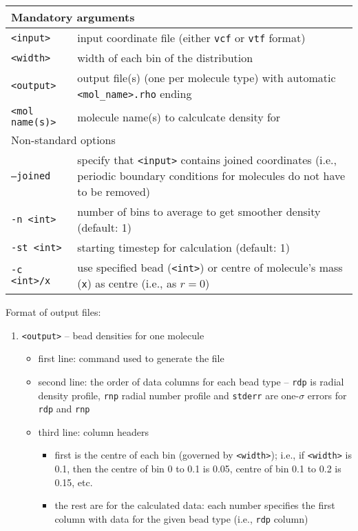 \noindent
\begin{longtable}{p{}p{}}
  \toprule
  \multicolumn{2}{l}{Mandatory arguments} \\
  \midrule
  \texttt{<input>} & input coordinate file (either \texttt{vcf} or
    \texttt{vtf} format) \\
  \texttt{<width>} & width of each bin of the distribution \\
  \texttt{<output>} & output file(s) (one per molecule type) with
    automatic \texttt{<mol\_name>.rho} ending \\
  \texttt{<mol name(s)>} & molecule name(s) to calculcate density for \\
  \toprule
  \multicolumn{2}{l}{Non-standard options} \\
  \midrule
  \texttt{--joined} & specify that \texttt{<input>} contains joined
    coordinates (i.e., periodic boundary conditions for molecules do not
    have to be removed) \\
  \texttt{-n <int>} & number of bins to average to get smoother density
    (default: 1) \\
  \texttt{-st <int>} & starting timestep for calculation (default: 1) \\
  \texttt{-c <int>/x} & use specified bead (\texttt{<int>}) or centre of
    molecule's mass (\texttt{x}) as centre (i.e., as $r=0$) \\
  \bottomrule
\end{longtable}

\noindent
Format of output files:
\begin{enumerate}[nosep,leftmargin=20pt]
  \item \texttt{<output>} -- bead densities for one molecule
    \begin{itemize}[nosep,leftmargin=5pt]
      \item first line: command used to generate the file
      \item second line: the order of data columns for each bead type --
        \texttt{rdp} is radial density profile, \texttt{rnp} radial number
        profile and \texttt{stderr} are one-$\sigma$ errors for \texttt{rdp}
        and \texttt{rnp}
      \item third line: column headers
        \begin{itemize}[nosep,leftmargin=10pt]
          \item first is the centre of each bin (governed by
            \texttt{<width>}); i.e., if \texttt{<width>} is 0.1,
            then the centre of bin 0 to 0.1 is 0.05, centre of bin 0.1 to
            0.2 is 0.15, etc.
          \item the rest are for the calculated data: each number specifies
            the first column with data for the given bead type (i.e.,
            \texttt{rdp} column)
        \end{itemize}
    \end{itemize}
\end{enumerate}
